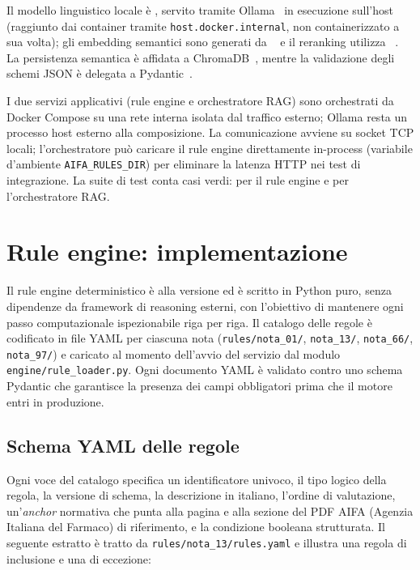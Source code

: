 \begin{sloppypar}
Il modello linguistico locale è \llmmodel, servito tramite Ollama~\cite{ollama2024}
in esecuzione sull'host (raggiunto dai container tramite
\texttt{host.docker.internal}, non containerizzato a sua volta); gli
embedding semantici sono generati da
\embedmodel~\cite{reimers2019sbert} e il reranking utilizza
\reranker~\cite{nickprock2023}. La persistenza semantica è affidata a
ChromaDB~\cite{chromadb}, mentre la validazione degli schemi JSON è delegata
a Pydantic~\cite{pydantic}.
\end{sloppypar}

I due servizi applicativi (rule engine e orchestratore RAG) sono orchestrati
da Docker Compose su una rete interna isolata dal traffico esterno; Ollama
resta un processo host esterno alla composizione. La
comunicazione avviene su socket TCP locali; l'orchestratore può caricare il
rule engine direttamente in-process (variabile d'ambiente
\texttt{AIFA\_RULES\_DIR}) per eliminare la latenza HTTP nei test di
integrazione. La suite di test conta \testcountall{} casi verdi: \testcountengine{}
per il rule engine e \testcountorch{} per l'orchestratore RAG.

\section{Rule engine: implementazione}
\label{sec:rule-engine-impl}

Il rule engine deterministico è alla versione \engineversion{} ed è scritto
in Python puro, senza dipendenze da framework di reasoning esterni, con
l'obiettivo di mantenere ogni passo computazionale ispezionabile riga per
riga. Il catalogo delle regole è codificato in file YAML per ciascuna nota
(\texttt{rules/nota\_01/}, \texttt{nota\_13/}, \texttt{nota\_66/},
\texttt{nota\_97/}) e caricato al momento dell'avvio del servizio dal
modulo \texttt{engine/rule\_loader.py}. Ogni documento YAML è validato contro
uno schema Pydantic che garantisce la presenza dei campi obbligatori prima
che il motore entri in produzione.

\subsection{Schema YAML delle regole}

Ogni voce del catalogo specifica un identificatore univoco, il tipo logico
della regola, la versione di schema, la descrizione in italiano, l'ordine di
valutazione, un'\emph{anchor} normativa che punta alla pagina e alla sezione
del PDF AIFA (Agenzia Italiana del Farmaco) di riferimento, e la condizione booleana strutturata. Il seguente
estratto è tratto da \texttt{rules/nota\_13/rules.yaml} e illustra una regola
di inclusione e una di eccezione:

